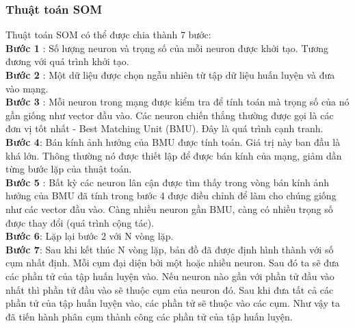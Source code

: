 	\subsubsection{Thuật toán SOM}
	Thuật toán SOM có thể được chia thành 7 bước:\\
	\textbf{Bước 1} : Số lượng neuron và trọng số của mỗi neuron được khởi tạo.
	Tương đương với quá trình khởi tạo.\\
	\textbf{Bước 2} : Một dữ liệu được chọn ngẫu nhiên từ tập dữ liệu huấn
	luyện và đưa vào mạng.\\
	\textbf{Bước 3} : Mỗi neuron trong mạng được kiểm tra để tính toán mà trọng số
	của nó gần giống như vector đầu vào. Các neuron chiến thắng thường được gọi là
	các đơn vị tốt nhất - Best Matching Unit (BMU). Đây là quá trình cạnh tranh.\\
	\textbf{Bước 4}: Bán kính ảnh hưởng của BMU được tính toán. Giá trị này ban đầu
là khá lớn. Thông thường nó được thiết lập để được bán kính của mạng, giảm dần
từng bước lặp của thuật toán.\\
	\textbf{Bước 5} : Bất kỳ các neuron lân cận được tìm thấy trong vòng bán kính ảnh hưởng của BMU đã tính trong bước 4 được điều chỉnh để làm cho chúng giống như các vector đầu vào. Càng nhiều neuron gần BMU, càng có nhiều trọng số được thay đổi (quá trình cộng tác).\\
	\textbf{Bước 6}: Lặp lại bước 2 với N vòng lặp.\\
	\textbf{Bước 7}: Sau khi kết thúc N vòng lặp, bản đồ đã được định hình thành
	với số cụm nhất định. Mỗi cụm đại diện bởi một hoặc nhiều neuron. Sau đó ta sẽ đưa các phần
tử của tập huấn luyện vào. Nếu neuron nào gần với phần tử đầu vào nhất thì phần
tử đầu vào sẽ thuộc cụm của neuron đó. Sau khi đưa tất cả các phần tử của tập
huấn luyện vào, các phần tử sẽ thuộc vào các cụm. Như vậy ta đã tiến hành phân
cụm thành công các phần tử của tập huấn luyện.     
